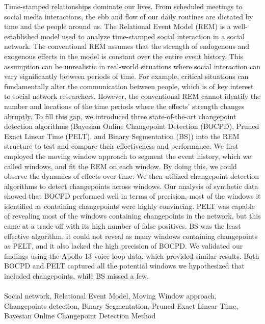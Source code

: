 \documentclass[]{interact}
\theoremstyle{plain}%
\theoremstyle{definition}
\theoremstyle{remark}
\begin{document}
	\small{Time-stamped relationships dominate our lives. From scheduled meetings to social media interactions, the ebb and flow of our daily routines are dictated by time and the people around us. The Relational Event Model (REM) is a well-established model used to analyze time-stamped social interaction in a social network. The conventional REM assumes that the strength of endogenous and exogenous effects in the model is constant over the entire event history. This assumption can be unrealistic in real-world situations where social interaction can vary significantly between periods of time. For example, critical situations can fundamentally alter the communication between people, which is of key interest to social network researchers. However, the conventional REM cannot identify the number and locations of the time periods where the effects' strength changes abruptly. To fill this gap, we introduced three state-of-the-art changepoint detection algorithms (Bayesian Online Changepoint Detection (BOCPD), Pruned Exact Linear Time (PELT), and Binary Segmentation (BS)) into the REM structure to test and compare their effectiveness and performance. We first employed the moving window approach to segment the event history, which we called windows, and fit the REM on each window. By doing this, we could observe the dynamics of effects over time. We then utilized changepoint detection algorithms to detect changepoints across windows. Our analysis of synthetic data showed that BOCPD performed well in terms of precision, most of the windows it identified as containing changepoints were highly convincing. PELT was capable of revealing most of the windows containing changepoints in the network, but this came at a trade-off with its high number of false positives. BS was the least effective algorithm, it could not reveal as many windows containing changepoints as PELT, and it also lacked the high precision of BOCPD. We validated our findings using the Apollo 13 voice loop data, which provided similar results. Both BOCPD and PELT captured all the potential windows we hypothesized that included changepoints, while BS missed a few.} \\
	
	 \\
	\small{Social network, Relational Event Model, Moving Window approach, Changepoints detection, Binary Segmentation, Pruned Exact Linear Time, Bayesian Online Changepoint Detection Method} \\
	
\end{document}
